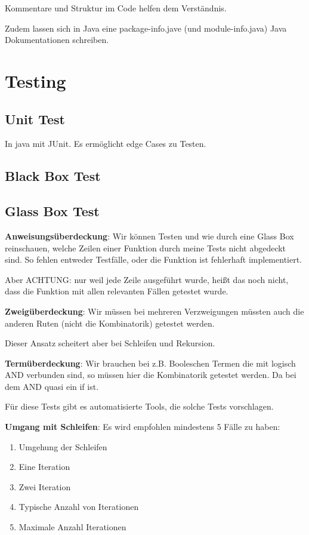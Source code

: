 \documentclass[a4paper]{article}
\begin{document}
Kommentare und Struktur im Code helfen dem Verständnis.

Zudem lassen sich in Java eine package-info.jave (und module-info.java) Java Dokumentationen schreiben.

\section{Testing}

\subsection{Unit Test}

In java mit JUnit. Es ermöglicht edge Cases zu Testen.

\subsection{Black Box Test}


\subsection{Glass Box Test}

\textbf{Anweisungsüberdeckung}: Wir können Testen und wie durch eine Glass Box reinschauen, welche Zeilen einer Funktion durch meine Tests nicht abgedeckt sind. So fehlen entweder Testfälle, oder die Funktion ist fehlerhaft implementiert.

Aber ACHTUNG: nur weil jede Zeile ausgeführt wurde, heißt das noch nicht, dass die Funktion mit allen relevanten Fällen getestet wurde.

\textbf{Zweigüberdeckung}: Wir müssen bei mehreren Verzweigungen müssten auch die anderen Ruten (nicht die Kombinatorik) getestet werden.

Dieser Ansatz scheitert aber bei Schleifen und Rekursion.

\textbf{Termüberdeckung}: Wir brauchen bei z.B. Booleschen Termen die mit logisch AND verbunden sind, so müssen hier die Kombinatorik getestet werden. Da bei dem AND quasi ein if ist.

Für diese Tests gibt es automatisierte Tools, die solche Tests vorschlagen.

\textbf{Umgang mit Schleifen}: Es wird empfohlen mindestens 5 Fälle zu haben:

\begin{enumerate}
    \item Umgehung der Schleifen
    \item Eine Iteration
    \item Zwei Iteration
    \item Typische Anzahl von Iterationen
    \item Maximale Anzahl Iterationen
\end{enumerate}
\end{document}
